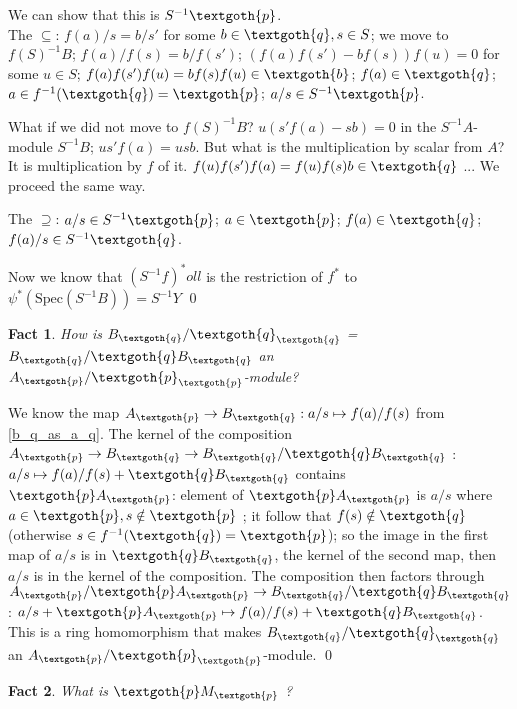 \documentclass{article}
\newtheorem{theorem}{Fact}[section]
\begin{document}
We can show that this is $S^{-1}\textgoth{p}$. \\

The $\subseteq$: $f(a)/s = b/s'$ for some $b \in \textgoth{q}, s \in S$; we move to $f(S)^{-1}B$; $f(a)/f(s) = b/f(s')$; $(f(a)f(s') - bf(s))f(u) = 0$ for some $u \in S$; $f(a)f(s')f(u) = bf(s)f(u) \in \textgoth{b}$; $f(a) \in \textgoth{q}$; $a \in f^{-1}(\textgoth{q}) = \textgoth{p}$; $a/s \in S^{-1}\textgoth{p}$. 

What if we did not move to $f(S)^{-1}B$? $u(s'f(a) - sb) = 0$ in the $S^{-1}A$-module $S^{-1}B$; $us'f(a) = usb$. But what is the multiplication by scalar from $A$? It is multiplication by $f$ of it. $f(u)f(s')f(a) = f(u)f(s)b \in \textgoth{q}$ ... We proceed the same way.

The $\supseteq$: $a/s \in S^{-1}\textgoth{p}$; $a \in \textgoth{p}$; $f(a) \in \textgoth{q}$; $f(a)/s \in S^{-1}\textgoth{q}$.

Now we know that $(S^{-1}f)^*oll$ is the restriction of $f^*$ to $\psi^*(\textrm{Spec}(S^{-1}B)) = S^{-1}Y$
\qed

\bigskip
\begin{theorem}
How is $B_\textgoth{q} / \textgoth{q}_\textgoth{q}$ = $B_\textgoth{q}/\textgoth{q}B_\textgoth{q}$ an $A_\textgoth{p} / \textgoth{p}_\textgoth{p}$-module?
\end{theorem}

\noindent
We know the map $A_\textgoth{p} \rightarrow B_\textgoth{q} : a/s \mapsto f(a)/f(s)$ from \ref{b_q_as_a_q}.
The kernel of the composition $A_\textgoth{p} \rightarrow B_\textgoth{q} \rightarrow B_\textgoth{q} / \textgoth{q} B_\textgoth{q}$ : $a/s \mapsto f(a)/f(s) + \textgoth{q} B_\textgoth{q}$ contains $\textgoth{p} A_\textgoth{p}$: 
element of $\textgoth{p}A_\textgoth{p}$ is $a/s$ where $a \in \textgoth{p}, s \notin \textgoth{p}$ ; it follow that $f(s) \notin \textgoth{q}$ (otherwise $s \in f^{-1}(\textgoth{q}) = \textgoth{p}$); so the image in the first map of $a/s$ is in $\textgoth{q}B_\textgoth{q}$, the kernel of the second map, then $a/s$ is in the kernel of the composition.
The composition then factors through $A_\textgoth{p} / \textgoth{p} A_\textgoth{p} \rightarrow B_\textgoth{q} / \textgoth{q} B_\textgoth{q}$: $a/s + \textgoth{p} A_\textgoth{p} \mapsto f(a)/f(s) + \textgoth{q} B_\textgoth{q}$. This is a ring homomorphism that makes $B_\textgoth{q} / \textgoth{q}_\textgoth{q}$ an $A_\textgoth{p} / \textgoth{p}_\textgoth{p}$-module.
\qed

\bigskip
\begin{theorem}
What is $\textgoth{p} M_\textgoth{p}$ ?
\end{theorem}
\end{document}
